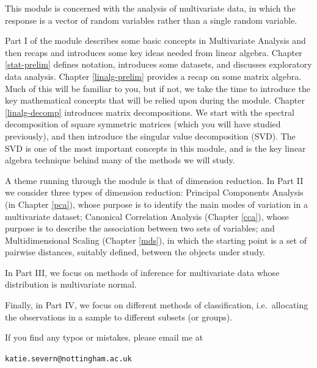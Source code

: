 \documentclass[
]{book}
\theoremstyle{definition}
\theoremstyle{definition}
\theoremstyle{definition}
\theoremstyle{definition}
\theoremstyle{remark}
\begin{document}
\newcommand{\tcov}{\text{cov}}
\newcommand{\texp}{\text{exp}}
\newcommand{\lb}{\left(}
\newcommand{\rb}{\right)}
\newcommand{\lsb}{\left[}
\newcommand{\rsb}{\right]}
\newcommand{\BE}{{\mathbb{E}}}
\newcommand{\BP}{{\mathbb{P}}}
\newcommand{\cov}{{\mathbb{C}\operatorname{ov}}}
\newcommand{\var}{{\mathbb{V}\operatorname{ar}}}
\newcommand{\cor}{{\mathbb{C}\operatorname{or}}}

This module is concerned with the analysis of multivariate data, in which the response is a vector of random variables rather than a single random variable.

Part I of the module describes some basic concepts in Multivariate Analysis and then recaps and introduces some key ideas needed from linear algebra.
Chapter \ref{stat-prelim} defines notation, introduces some datasets, and discusses exploratory data analysis. Chapter \ref{linalg-prelim} provides a recap on some matrix algebra. Much of this will be familiar to you, but if not, we take the time to introduce the key mathematical concepts that will be relied upon during the module. Chapter \ref{linalg-decomp} introduces matrix decompositions. We start with the spectral decomposition of square symmetric matrices (which you will have studied previously), and then introduce the singular value decomposition (SVD). The SVD is one of the most important concepts in this module, and is the key linear algebra technique behind many of the methods we will study.

A theme running through the module is that of dimension reduction. In Part II we consider three types of dimension reduction: Principal Components Analysis (in Chapter \ref{pca}),
whose purpose is to identify the main modes of variation in a multivariate dataset; Canonical Correlation Analysis (Chapter \ref{cca}), whose purpose is to describe the association between two sets of variables; and Multidimensional Scaling (Chapter \ref{mds}), in which the starting point is a set of pairwise distances, suitably defined, between the objects under study.

In Part III, we focus on methods of inference for multivariate data whose distribution is multivariate normal.

Finally, in Part IV, we focus on different methods of classification, i.e.~allocating the observations in a sample to different subsets (or groups).

If you find any typos or mistakes, please email me at

\texttt{katie.severn@nottingham.ac.uk}
\end{document}
